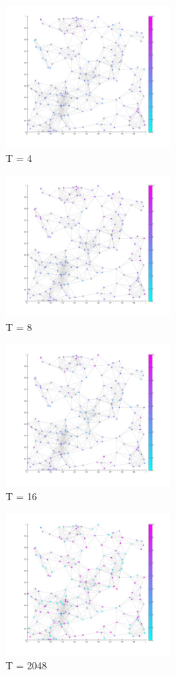 \documentclass[12pt]{report}
\begin{document}
\begin{figure}[h]
    \centering
    \includegraphics[height=200px]{temp4}
    \caption{ T = 4 }
\end{figure}

\begin{figure}[h]
    \centering
    \includegraphics[height=200px]{temp8}
    \caption{ T = 8 }
\end{figure}

\begin{figure}[h]
    \centering
    \includegraphics[height=200px]{temp16}
    \caption{ T = 16 }
\end{figure}

\begin{figure}[h]
    \centering
    \includegraphics[height=200px]{temp2048}
    \caption{ T = 2048 }
\end{figure}
\end{document}
